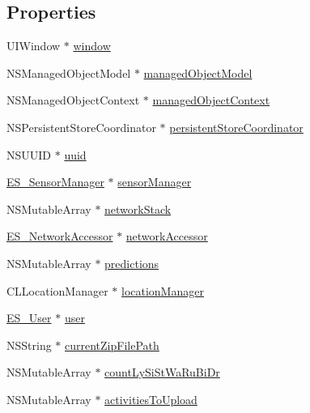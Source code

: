 \subsection*{Properties}
\begin{DoxyCompactItemize}
\item 
U\+I\+Window $\ast$ \hyperlink{interface_e_s___app_delegate_a23e2341825c59a4c6f347bea8b993c93}{window}
\item 
N\+S\+Managed\+Object\+Model $\ast$ \hyperlink{interface_e_s___app_delegate_abbb6de4a794de1f75bda5c2e0bccd328}{managed\+Object\+Model}
\item 
N\+S\+Managed\+Object\+Context $\ast$ \hyperlink{interface_e_s___app_delegate_a5b1e1e8b44eecce334f3460e71eddb2b}{managed\+Object\+Context}
\item 
N\+S\+Persistent\+Store\+Coordinator $\ast$ \hyperlink{interface_e_s___app_delegate_ae1b7c395b0d5fe3b653696955ea3a7f2}{persistent\+Store\+Coordinator}
\item 
N\+S\+U\+U\+I\+D $\ast$ \hyperlink{interface_e_s___app_delegate_a8ee3cd0a248c6c4278d7a47f1a209de8}{uuid}
\item 
\hyperlink{interface_e_s___sensor_manager}{E\+S\+\_\+\+Sensor\+Manager} $\ast$ \hyperlink{interface_e_s___app_delegate_a10cde2da011b136185a2ec1c487aa9b8}{sensor\+Manager}
\item 
N\+S\+Mutable\+Array $\ast$ \hyperlink{interface_e_s___app_delegate_a33cbe1cc0439892b89b132bffac51092}{network\+Stack}
\item 
\hyperlink{interface_e_s___network_accessor}{E\+S\+\_\+\+Network\+Accessor} $\ast$ \hyperlink{interface_e_s___app_delegate_a94ebf7775cdbcfc9487f6a0b7b52a703}{network\+Accessor}
\item 
N\+S\+Mutable\+Array $\ast$ \hyperlink{interface_e_s___app_delegate_a99ee660141070586dfb12e58bbb2bb7f}{predictions}
\item 
C\+L\+Location\+Manager $\ast$ \hyperlink{interface_e_s___app_delegate_a99c4576cb9f0549816c81adb7cc21e48}{location\+Manager}
\item 
\hyperlink{interface_e_s___user}{E\+S\+\_\+\+User} $\ast$ \hyperlink{interface_e_s___app_delegate_abe1e22079167d44f4bede0952f700c52}{user}
\item 
N\+S\+String $\ast$ \hyperlink{interface_e_s___app_delegate_a7bd93a2eb34489487b480ed5a944cea0}{current\+Zip\+File\+Path}
\item 
N\+S\+Mutable\+Array $\ast$ \hyperlink{interface_e_s___app_delegate_a2429ae456b3143bf705f3de121a9b303}{count\+Ly\+Si\+St\+Wa\+Ru\+Bi\+Dr}
\item 
N\+S\+Mutable\+Array $\ast$ \hyperlink{interface_e_s___app_delegate_a29cc59d395fcf039b4d0edcd861f9ce2}{activities\+To\+Upload}
\end{DoxyCompactItemize}


